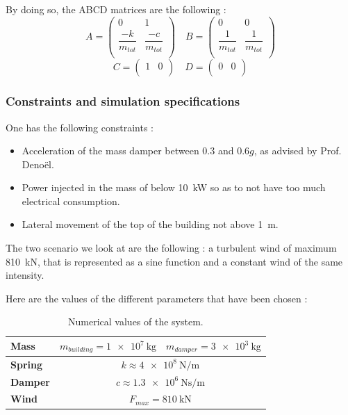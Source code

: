 By doing so, the ABCD matrices are the following :
$$
A = \begin{pmatrix}
    0 & 1\\
    \dfrac{-k}{m_{tot}} & \dfrac{-c}{m_{tot}}\\
\end{pmatrix}
\quad
B = \begin{pmatrix}
    0 & 0\\
    \dfrac{1}{m_{tot}} & \dfrac{1}{m_{tot}}\\
\end{pmatrix}
$$
$$
C = \begin{pmatrix}
    1 & 0\\
\end{pmatrix}
\quad
D = \begin{pmatrix}
    0 & 0\\
\end{pmatrix}
$$

\subsubsection{Constraints and simulation specifications}
One has the following constraints : 
\begin{itemize}
    \item Acceleration of the mass damper between \num{0.3} and \num{0.6}$g$, as advised by Prof. Denoël.
    \item Power injected in the mass of below \SI{10}{\kilo\watt} so as to not have too much electrical consumption.
    \item Lateral movement of the top of the building not above \SI{1}{\meter}.
\end{itemize}
The two scenario we look at are the following : a turbulent wind of maximum \SI{810}{\kilo\newton}, that is represented as a sine function and a constant wind of the same intensity.\par
Here are the values of the different parameters that have been chosen : 
\begin{table}[H]
    \centering
    \begin{tabular}{|l|c|c|}
        \hline
        {\bf Mass} & $m_{building} = \SI{1e7}{\kilogram}$ & $m_{damper} = \SI{3e3}{\kilogram}$\\ \hline
        {\bf Spring} & \multicolumn{2}{c|}{$k\approx\SI{4e8}{\newton\per\meter}$}\\ \hline
        {\bf Damper} & \multicolumn{2}{c|}{$c\approx\SI{1.3e6}{\newton\second\per\meter}$}\\ \hline
        {\bf Wind} & \multicolumn{2}{c|}{$F_{max} = \SI{810}{\kilo\newton}$}\\ \hline
    \end{tabular}
    \caption{Numerical values of the system.}
    \label{tab:numerical-values}
\end{table}

